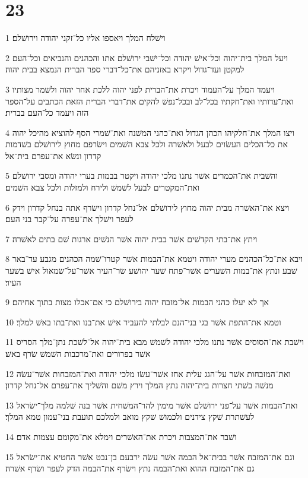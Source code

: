 \chapter{23}

\par 1 וישׁלח המלך ויאספו אליו כל־זקני יהודה וירושׁלם׃
\par 2 ויעל המלך בית־יהוה וכל־אישׁ יהודה וכל־ישׁבי ירושׁלם אתו והכהנים והנביאים וכל־העם למקטן ועד־גדול ויקרא באזניהם את־כל־דברי ספר הברית הנמצא בבית יהוה׃
\par 3 ויעמד המלך על־העמוד ויכרת את־הברית לפני יהוה ללכת אחר יהוה ולשׁמר מצותיו ואת־עדותיו ואת־חקתיו בכל־לב ובכל־נפשׁ להקים את־דברי הברית הזאת הכתבים על־הספר הזה ויעמד כל־העם בברית׃
\par 4 ויצו המלך את־חלקיהו הכהן הגדול ואת־כהני המשׁנה ואת־שׁמרי הסף להוציא מהיכל יהוה את כל־הכלים העשׂוים לבעל ולאשׁרה ולכל צבא השׁמים וישׂרפם מחוץ לירושׁלם בשׁדמות קדרון ונשׂא את־עפרם בית־אל׃
\par 5 והשׁבית את־הכמרים אשׁר נתנו מלכי יהודה ויקטר בבמות בערי יהודה ומסבי ירושׁלם ואת־המקטרים לבעל לשׁמשׁ ולירח ולמזלות ולכל צבא השׁמים׃
\par 6 ויצא את־האשׁרה מבית יהוה מחוץ לירושׁלם אל־נחל קדרון וישׂרף אתה בנחל קדרון וידק לעפר וישׁלך את־עפרה על־קבר בני העם׃
\par 7 ויתץ את־בתי הקדשׁים אשׁר בבית יהוה אשׁר הנשׁים ארגות שׁם בתים לאשׁרה׃
\par 8 ויבא את־כל־הכהנים מערי יהודה ויטמא את־הבמות אשׁר קטרו־שׁמה הכהנים מגבע עד־באר שׁבע ונתץ את־במות השׁערים אשׁר־פתח שׁער יהושׁע שׂר־העיר אשׁר־על־שׂמאול אישׁ בשׁער העיר׃
\par 9 אך לא יעלו כהני הבמות אל־מזבח יהוה בירושׁלם כי אם־אכלו מצות בתוך אחיהם׃
\par 10 וטמא את־התפת אשׁר בגי בני־הנם לבלתי להעביר אישׁ את־בנו ואת־בתו באשׁ למלך׃
\par 11 וישׁבת את־הסוסים אשׁר נתנו מלכי יהודה לשׁמשׁ מבא בית־יהוה אל־לשׁכת נתן־מלך הסריס אשׁר בפרורים ואת־מרכבות השׁמשׁ שׂרף באשׁ׃
\par 12 ואת־המזבחות אשׁר על־הגג עלית אחז אשׁר־עשׂו מלכי יהודה ואת־המזבחות אשׁר־עשׂה מנשׁה בשׁתי חצרות בית־יהוה נתץ המלך וירץ משׁם והשׁליך את־עפרם אל־נחל קדרון׃
\par 13 ואת־הבמות אשׁר על־פני ירושׁלם אשׁר מימין להר־המשׁחית אשׁר בנה שׁלמה מלך־ישׂראל לעשׁתרת שׁקץ צידנים ולכמושׁ שׁקץ מואב ולמלכם תועבת בני־עמון טמא המלך׃
\par 14 ושׁבר את־המצבות ויכרת את־האשׁרים וימלא את־מקומם עצמות אדם׃
\par 15 וגם את־המזבח אשׁר בבית־אל הבמה אשׁר עשׂה ירבעם בן־נבט אשׁר החטיא את־ישׂראל גם את־המזבח ההוא ואת־הבמה נתץ וישׂרף את־הבמה הדק לעפר ושׂרף אשׁרה׃
